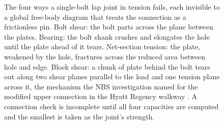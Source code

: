 \begin{figure}[htbp]
\caption[Four bolted-joint failure modes]{The four ways a single-bolt
lap joint in tension fails, each invisible to a global free-body diagram
that treats the connection as a frictionless pin. Bolt shear: the bolt
parts across the plane between the plates. Bearing: the bolt shank crushes
and elongates the hole until the plate ahead of it tears. Net-section
tension: the plate, weakened by the hole, fractures across the reduced
area between hole and edge. Block shear: a chunk of plate behind the bolt
tears out along two shear planes parallel to the load and one tension
plane across it, the mechanism the NBS investigation named for the
modified upper connection in the Hyatt Regency walkway
\cite{acc:nbs-hyatt-1982}. A connection check is incomplete until all four
capacities are computed and the smallest is taken as the joint's
strength.}
\label{fig:vol03ch02:bolt-failure-modes}
\end{figure}
